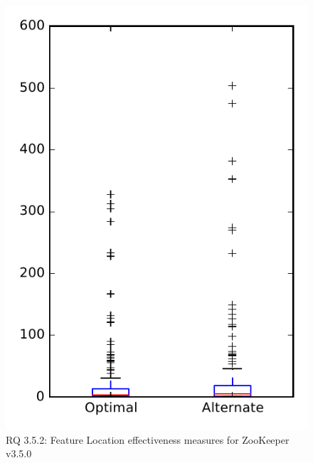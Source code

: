 
\begin{figure}
\centering
\includegraphics[height=0.4\textheight]{figures/combo/flt_rq2_zookeeper}
\caption{RQ 3.5.2: Feature Location effectiveness measures for ZooKeeper v3.5.0}
\label{fig:flt:rq2:zookeeper}
\end{figure}
